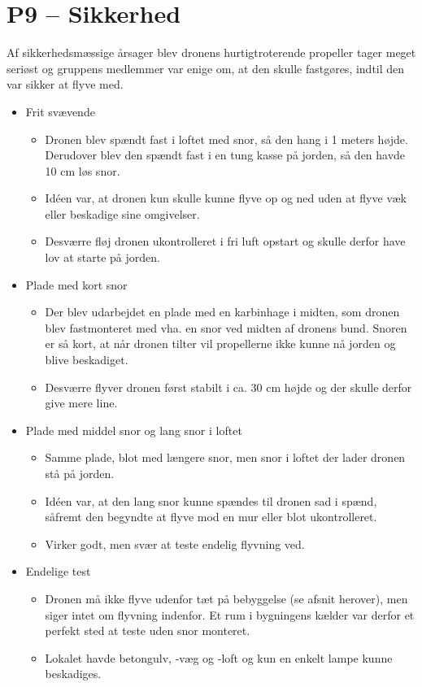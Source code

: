 \documentclass[Main]{subfiles}
\begin{document}
\section[Sikkerhed]{P9 -- Sikkerhed}
Af sikkerhedsmæssige årsager blev dronens hurtigtroterende propeller tager meget seriøst og gruppens medlemmer var enige om, at den skulle fastgøres, indtil den var sikker at flyve med.
\begin{itemize}
\item Frit svævende
	\begin{itemize}
	\item Dronen blev spændt fast i loftet med snor, så den hang i 1 meters højde. Derudover blev den spændt fast i en tung kasse på jorden, så den havde 10 cm løs snor. 
	\item Idéen var, at dronen kun skulle kunne flyve op og ned uden at flyve væk eller beskadige sine omgivelser.
	\item Desværre fløj dronen ukontrolleret i fri luft opstart og skulle derfor have lov at starte på jorden.
	\end{itemize}
	
\item Plade med kort snor
	\begin{itemize}
	\item Der blev udarbejdet en plade med en karbinhage i midten, som dronen blev fastmonteret med vha. en snor ved midten af dronens bund.
	Snoren er så kort, at når dronen tilter vil propellerne ikke kunne nå jorden og blive beskadiget.
	\item Desværre flyver dronen først stabilt i ca. 30 cm højde og der skulle derfor give mere line.
	\end{itemize}
	
\item Plade med middel snor og lang snor i loftet
	\begin{itemize}
	\item Samme plade, blot med længere snor, men snor i loftet der lader dronen stå på jorden.
	\item Idéen var, at den lang snor kunne spændes til dronen sad i spænd, såfremt den begyndte at flyve mod en mur eller blot ukontrolleret.
	\item Virker godt, men svær at teste endelig flyvning ved.
	\end{itemize}

\item Endelige test
	\begin{itemize}
	\item Dronen må ikke flyve udenfor tæt på bebyggelse (se afsnit herover), men siger intet om flyvning indenfor. Et rum i bygningens kælder var derfor et perfekt sted at teste uden snor monteret.
	\item Lokalet havde betongulv, -væg og -loft og kun en enkelt lampe kunne beskadiges. 
	\end{itemize}
\end{itemize}
\end{document}
